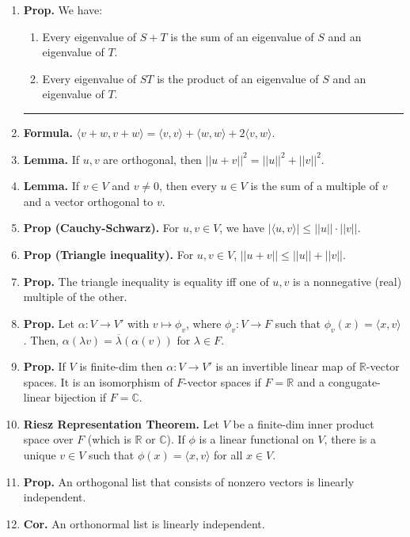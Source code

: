 \begin{enumerate}
	\item \textbf{Prop. } We have: 
	\begin{enumerate}
		\item Every eigenvalue of $S+T$ is the sum of an eigenvalue of $S$ and an eigenvalue of $T$. 
		\item Every eigenvalue of $ST$ is the product of an eigenvalue of $S$ and an eigenvalue of $T$. 
	\end{enumerate}
	\begin{center}
		\hrule
	\end{center}
	\item \textbf{Formula. } $\langle v+w, v+w \rangle = \langle v,v \rangle + \langle w,w \rangle + 2\langle v,w \rangle$. 
	\item \textbf{Lemma. } If $u,v$ are orthogonal, then $||u+v||^2 = ||u||^2 + ||v||^2$. 
	\item \textbf{Lemma. } If $v \in V$ and $v \neq 0$, then every $u \in V$ is the sum of a multiple of $v$ and a vector orthogonal to $v$. 
	\item \textbf{Prop (Cauchy-Schwarz). } For $u,v \in V$, we have $|\langle u,v \rangle| \leq ||u|| \cdot ||v||$. 
	\item \textbf{Prop (Triangle inequality). } For $u,v \in V$, $||u+v|| \leq ||u|| + ||v||$. 
	\item \textbf{Prop. } The triangle inequality is equality iff one of $u,v$ is a nonnegative (real) multiple of the other. 
	\item \textbf{Prop. } Let $\alpha: V \to V'$ with $v \mapsto \phi_v$, where $\phi_v: V \to F$ such that $\phi_v(x) = \langle x,v \rangle$. Then, $\alpha(\lambda v) = \overline{\lambda}(\alpha(v))$ for $\lambda \in F$. 
	\item \textbf{Prop. } If $V$ is finite-dim then $\alpha: V \to V'$ is an invertible linear map of $\mathbb{R}$-vector spaces. It is an isomorphism of $F$-vector spaces if $F=\mathbb{R}$ and a congugate-linear bijection if $F = \mathbb{C}$. 
	\item \textbf{Riesz Representation Theorem. } Let $V$ be a finite-dim inner product space over $F$ (which is $\mathbb{R}$ or $\mathbb{C}$). If $\phi$ is a linear functional on $V$, there is a unique $v \in V$ such that $\phi(x) = \langle x,v \rangle$ for all $x \in V$. 
	\item \textbf{Prop. } An orthogonal list that consists of nonzero vectors is linearly independent. 
	\item \textbf{Cor. } An orthonormal list is linearly independent. 

\end{enumerate}

